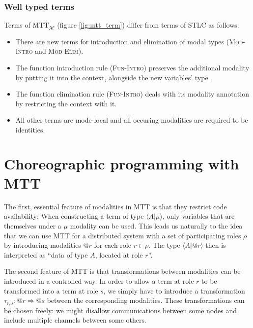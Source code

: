 \documentclass{scrartcl}
\theoremstyle{definition}
\theoremstyle{plain}
\newcommand{\MTTM}{MTT${}_{\mathcal{M}}$}
\begin{document}

\subsubsection*{Well typed terms}
Terms of \MTTM{} (figure \ref{fig:mtt_term}) differ from terms of STLC as
follows:
\begin{itemize}
\item
  There are new terms for introduction and elimination of modal types
  (\textsc{Mod-Intro} and \textsc{Mod-Elim}).
\item
  The function introduction rule (\textsc{Fun-Intro}) preserves the additional
  modality by putting it into the context, alongside the new variables' type.
\item
  The function elimination rule (\textsc{Fun-Intro}) deals with its modality
  annotation by restricting the context with it.
\item
  All other terms are mode-local and all occuring modalities are required to be
  identities.
\end{itemize}

\section{Choreographic programming with MTT}
The first, essential feature of modalities in MTT is that they restrict code availability:
When constructing a term of type $\langle A | \mu \rangle$, only
variables that are themselves under a $\mu$ modality can be used. This leads
us naturally to the idea that we can use MTT for a distributed system with a set of
participating roles $\rho$ by introducing modalities $@r$ for each role $r \in
\rho$. The type $\langle A | @r \rangle$ then is interpreted as ``data of type
$A$, located at role $r$''.

\medskip

The second feature of MTT is that transformations between
modalities can be introduced in a controlled way. In order to allow a term at
role $r$ to be transformed into a term at role $s$, we simply have to introduce
a transformation $\tau_{r,s} : @r \Rightarrow @s$ between the corresponding
modalities. These transformations can be chosen freely: we might disallow
communications between some nodes and include multiple channels between some others.
\end{document}
